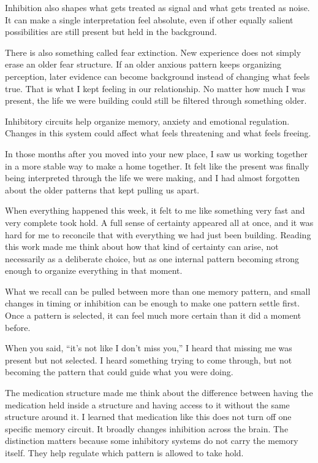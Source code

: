 \documentclass[10pt,twocolumn]{article}
\begin{document}
Inhibition also shapes what gets treated as signal and what gets treated as noise. It can make a single interpretation feel absolute, even if other equally salient possibilities are still present but held in the background.

There is also something called fear extinction. New experience does not simply erase an older fear structure. If an older anxious pattern keeps organizing perception, later evidence can become background instead of changing what feels true. That is what I kept feeling in our relationship. No matter how much I was present, the life we were building could still be filtered through something older.

Inhibitory circuits help organize memory, anxiety and emotional regulation. Changes in this system could affect what feels threatening and what feels freeing.

In those months after you moved into your new place, I saw us working together in a more stable way to make a home together. It felt like the present was finally being interpreted through the life we were making, and I had almost forgotten about the older patterns that kept pulling us apart.

When everything happened this week, it felt to me like something very fast and very complete took hold. A full sense of certainty appeared all at once, and it was hard for me to reconcile that with everything we had just been building. Reading this work made me think about how that kind of certainty can arise, not necessarily as a deliberate choice, but as one internal pattern becoming strong enough to organize everything in that moment.

What we recall can be pulled between more than one memory pattern, and small changes in timing or inhibition can be enough to make one pattern settle first. Once a pattern is selected, it can feel much more certain than it did a moment before.

When you said, ``it's not like I don't miss you,'' I heard that missing me was present but not selected. I heard something trying to come through, but not becoming the pattern that could guide what you were doing.

The medication structure made me think about the difference between having the medication held inside a structure and having access to it without the same structure around it. I learned that medication like this does not turn off one specific memory circuit. It broadly changes inhibition across the brain. The distinction matters because some inhibitory systems do not carry the memory itself. They help regulate which pattern is allowed to take hold.
\end{document}
